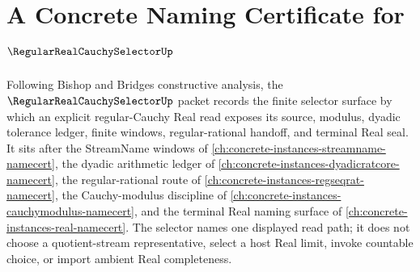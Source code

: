 \chapter{A Concrete Naming Certificate for $\RegularRealCauchySelectorUp$}
\label{ch:concrete-instances-regular-real-cauchy-selector-namecert}

Following Bishop and Bridges constructive analysis, the $\RegularRealCauchySelectorUp$ packet records the finite selector surface by which an explicit regular-Cauchy Real read exposes its source, modulus, dyadic tolerance ledger, finite windows, regular-rational handoff, and terminal Real seal. It sits after the StreamName windows of \autoref{ch:concrete-instances-streamname-namecert}, the dyadic arithmetic ledger of \autoref{ch:concrete-instances-dyadicratcore-namecert}, the regular-rational route of \autoref{ch:concrete-instances-regseqrat-namecert}, the Cauchy-modulus discipline of \autoref{ch:concrete-instances-cauchymodulus-namecert}, and the terminal Real naming surface of \autoref{ch:concrete-instances-real-namecert}. The selector names one displayed read path; it does not choose a quotient-stream representative, select a host Real limit, invoke countable choice, or import ambient Real completeness.

